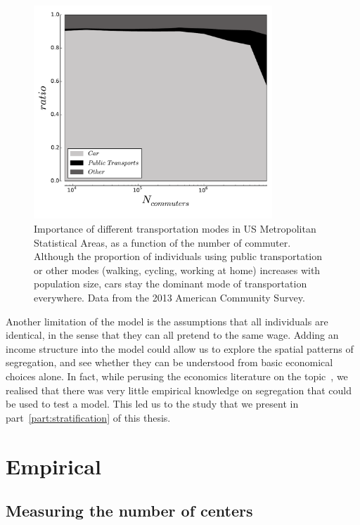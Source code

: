\begin{figure}[!h]
    \centering
    \includegraphics[width=0.8\textwidth]{gfx/chapter-monocentric/transportation_modes.pdf}
    \caption{Importance of different transportation modes in US Metropolitan
    Statistical Areas, as a function of the number of commuter. Although the
proportion of individuals using public transportation or other modes (walking,
cycling, working at home) increases with population size, cars stay the dominant
mode of transportation everywhere. Data from the 2013 American Community
Survey.\label{fig:transportation_mode}}
\end{figure}


Another limitation of the model is the assumptions that all individuals are
identical, in the sense that they can all pretend to the same wage. Adding an
income structure into the model could allow us to explore the spatial patterns
of segregation, and see whether they can be understood from basic economical
choices alone. In fact, while perusing the economics literature on the
topic~\cite{Glaeser:2008, Brueckner:1999}, we realised that there was very little
empirical knowledge on segregation that could be used to test a model. This led
us to the study that we present in part~\ref{part:stratification} of this
thesis.\\

\medskip

\section{Empirical}
\label{sec:empirical}

\subsection{Measuring the number of centers}
\label{sub:measuring_the_number_of_centers}

